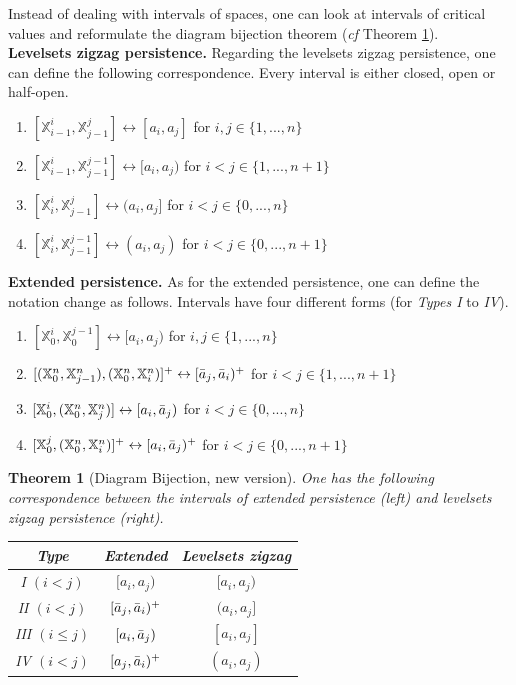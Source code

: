 \documentclass[11pt]{article}
\newtheorem{theorem}{Theorem}[section]
\theoremstyle{remark}
\newcommand{\X}{\mathbb{X}}
\begin{document}
 Instead of dealing with intervals of spaces, one can look at intervals of critical values and reformulate the diagram bijection theorem (\textit{cf} Theorem \ref{bijection_alternative}).\\

\noindent \textbf{Levelsets zigzag persistence.} Regarding the levelsets zigzag persistence, one can define the following correspondence. Every interval is either closed, open or half-open.
\begin{enumerate}
    \item $[\X_{i-1}^i,\X_{j-1}^j]\leftrightarrow [a_i,a_j]$ for $i,j\in \{1,...,n\}$
    \item $[\X_{i-1}^i,\X_{j-1}^{j-1}]\leftrightarrow [a_i,a_j)$ for $i<j\in \{1,...,n+1\}$
    \item $[\X_i^i,\X_{j-1}^j]\leftrightarrow (a_i,a_j]$ for $i<j\in \{0,...,n\}$
    \item $[\X_i^i,\X_{j-1}^{j-1}]\leftrightarrow (a_i,a_j)$ for $i<j\in \{0,...,n+1\}$
\end{enumerate}

\noindent \textbf{Extended persistence.} As for the extended persistence, one can define the notation change as follows. Intervals have four different forms (for \textit{Types I} to \textit{IV}).
\begin{enumerate}
    \item $[\X_0^i,\X_0^{j-1}]\leftrightarrow [a_i,a_j)$ for $i,j\in \{1,...,n\}$
    \item $[(\X_0^n,\X_{j-1}^n),(\X_0^n,\X_i^n)]^+\leftrightarrow [\Bar{a}_j,\Bar{a}_i)^+$ for $i<j\in \{1,...,n+1\}$
    \item $[\X_0^i,(\X_0^n,\X_j^n)]\leftrightarrow [a_i,\Bar{a}_j)$ for $i<j\in \{0,...,n\}$
    \item $[\X_0^j,(\X_0^n,\X_i^n)]^+\leftrightarrow [a_i,\Bar{a}_j)^+$ for $i<j\in \{0,...,n+1\}$
\end{enumerate}



\begin{theorem}[Diagram Bijection, new version]
\label{bijection_alternative}
One has the following correspondence between the intervals of extended persistence (left) and levelsets zigzag persistence (right).

\begin{center}
\begin{tabular}{|c c c|} 
 \hline
 Type & Extended & Levelsets zigzag\\ [0.5ex] 
 \hline
 I $(i<j)$ & $[a_i,a_j)$ & $[a_i,a_j)$ \\ 
\hline
 II $(i< j)$ & $[\Bar{a}_j,\Bar{a}_i)^+$ & $(a_i,a_j]$ \\
 \hline
 III  $(i\leq j)$ & $[a_i,\Bar{a}_j)$ & $[a_i,a_j]$\\
\hline
 IV $(i<j)$ & $[a_j,\Bar{a}_i)^+$ & $(a_i,a_j)$ \\
 \hline
\end{tabular}
\end{center}

\end{theorem}
\end{document}
